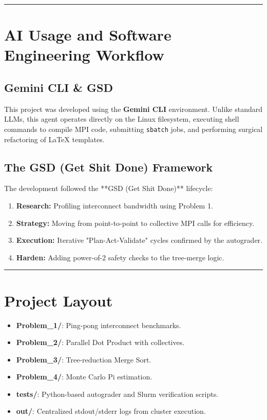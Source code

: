 \documentclass[11pt]{article}
\begin{document}
\noindent\rule{\textwidth}{0.4pt}

\section*{AI Usage and Software Engineering Workflow}

\subsection*{Gemini CLI \& GSD}
This project was developed using the \textbf{Gemini CLI} environment. Unlike standard LLMs, this agent operates directly on the Linux filesystem, executing shell commands to compile MPI code, submitting \texttt{sbatch} jobs, and performing surgical refactoring of LaTeX templates.

\subsection*{The GSD (Get Shit Done) Framework}
The development followed the **GSD (Get Shit Done)** lifecycle:
\begin{enumerate}[label=\alph*.]
    \item \textbf{Research:} Profiling interconnect bandwidth using Problem 1.
    \item \textbf{Strategy:} Moving from point-to-point to collective MPI calls for efficiency.
    \item \textbf{Execution:} Iterative "Plan-Act-Validate" cycles confirmed by the autograder.
    \item \textbf{Harden:} Adding power-of-2 safety checks to the tree-merge logic.
\end{enumerate}

\noindent\rule{\textwidth}{0.4pt}

\section*{Project Layout}
\begin{itemize}
    \item \textbf{Problem\_1/}: Ping-pong interconnect benchmarks.
    \item \textbf{Problem\_2/}: Parallel Dot Product with collectives.
    \item \textbf{Problem\_3/}: Tree-reduction Merge Sort.
    \item \textbf{Problem\_4/}: Monte Carlo Pi estimation.
    \item \textbf{tests/}: Python-based autograder and Slurm verification scripts.
    \item \textbf{out/}: Centralized stdout/stderr logs from cluster execution.
\end{itemize}
\end{document}
